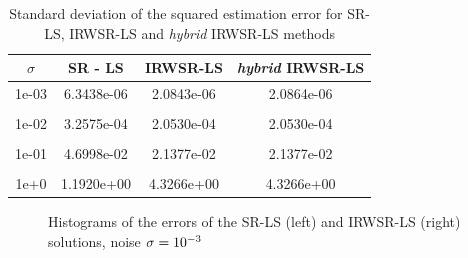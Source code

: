 \begin{table}
\centering
\caption{Standard deviation of the squared estimation error for SR-LS, IRWSR-LS and \textit{hybrid} IRWSR-LS methods}
\begin{tabular}{|c|c|c|c|} \hline
$\sigma$ & SR - LS & IRWSR-LS & \textit{hybrid} IRWSR-LS \\ \hline
1e-03&	6.3438e-06&	2.0843e-06 & 2.0864e-06\\ &&&\\
1e-02&	3.2575e-04&	2.0530e-04 & 2.0530e-04\\ &&&\\
1e-01&	4.6998e-02&	2.1377e-02 & 2.1377e-02\\ &&&\\
1e+0&	1.1920e+00&	4.3266e+00 & 4.3266e+00\\ %
\hline
\end{tabular}
\label{tab:2}
\end{table}



\begin{figure}%
\centering
\caption{Histograms of the errors of the SR-LS (left) and IRWSR-LS (right) solutions, noise $\protect\sigma = 10^{-3}$}
\label{fig:Noise03IRW}
\end{figure}

